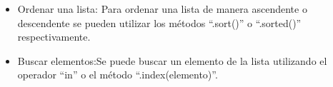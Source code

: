 \begin{itemize}
    \item Ordenar una lista: Para ordenar una lista de manera ascendente o descendente se pueden utilizar los métodos ``.sort()'' o ``.sorted()'' respectivamente.
    \begin{figure}[h]
        \centering
      \end{figure}

      \begin{figure}[h]
        \centering
      \end{figure}
    \newpage
    \item Buscar elementos:Se puede buscar un elemento de la lista utilizando el operador “in” o el método ``.index(elemento)''.
    \begin{figure}[h]
        \centering
      \end{figure}
    

\end{itemize}
